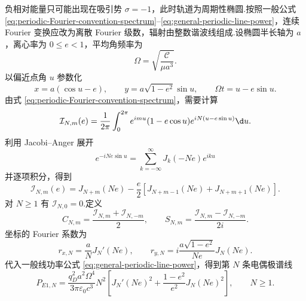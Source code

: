 负相对能量只可能出现在吸引势 $\sigma=-1$，此时轨道为周期性椭圆.按照一般公式 \eqref{eq:periodic-Fourier-convention-spectrum}--\eqref{eq:general-periodic-line-power}，连续 Fourier 变换应改为离散 Fourier 级数，辐射由整数谐波线组成.设椭圆半长轴为 $a$，离心率为 $0\leq e<1$，平均角频率为
\begin{equation}
 \Omega=\sqrt{\frac{\mathcal C}{\mu a^3}}.
\end{equation}
以偏近点角 $u$ 参数化
\begin{equation}
 x=a(\cos u-e),
 \qquad
 y=a\sqrt{1-e^2}\sin u,
 \qquad
 \Omega t=u-e\sin u.
 \label{eq:elliptic-eccentric-anomaly}
\end{equation}
由式 \eqref{eq:periodic-Fourier-convention-spectrum}，需要计算
\begin{equation}
 \mathcal I_{N,m}(e)
 =\frac{1}{2\pi}\int_0^{2\pi}
 e^{imu}(1-e\cos u)e^{iN(u-e\sin u)}\d u.
\end{equation}
利用 Jacobi--Anger 展开
\begin{equation}
 e^{-iNe\sin u}=\sum_{k=-\infty}^{\infty}J_k(-Ne)e^{iku}
\end{equation}
并逐项积分，得到
\begin{equation}
 \mathcal I_{N,m}(e)
 =J_{N+m}(Ne)-\frac{e}{2}
 \left[J_{N+m-1}(Ne)+J_{N+m+1}(Ne)\right].
 \label{eq:elliptic-master-Bessel-integral}
\end{equation}
对 $N\geq1$ 有 $\mathcal I_{N,0}=0$.定义
\begin{equation}
 C_{N,m}=\frac{\mathcal I_{N,m}+\mathcal I_{N,-m}}{2},
 \qquad
 S_{N,m}=\frac{\mathcal I_{N,m}-\mathcal I_{N,-m}}{2i}.
\end{equation}
坐标的 Fourier 系数为
\begin{equation}
 r_{x,N}=\frac{a}{N}J_N'(Ne),
 \qquad
 r_{y,N}=i\frac{a\sqrt{1-e^2}}{Ne}J_N(Ne).
 \label{eq:elliptic-coordinate-Fourier}
\end{equation}
代入一般线功率公式 \eqref{eq:general-periodic-line-power}，得到第 $N$ 条电偶极谱线
\begin{equation}
 P_{E1,N}
 =\frac{q_D^2a^2\Omega^4}{3\pi\varepsilon_0c^3}N^2
 \left[J_N'(Ne)^2+\frac{1-e^2}{e^2}J_N(Ne)^2\right],
 \qquad N\geq1.
 \label{eq:elliptic-E1-line-power}
\end{equation}

